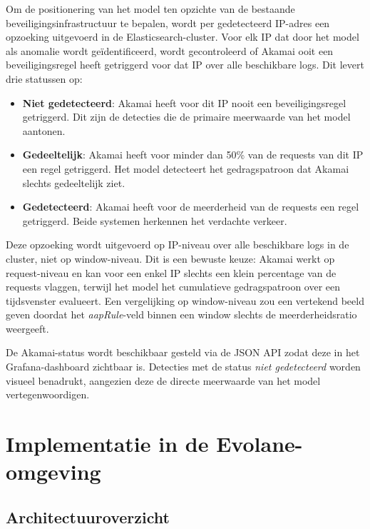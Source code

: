 Om de positionering van het model ten opzichte van de bestaande beveiligingsinfrastructuur te bepalen, wordt per gedetecteerd IP-adres een opzoeking uitgevoerd in de Elasticsearch-cluster. Voor elk IP dat door het model als anomalie wordt geïdentificeerd, wordt gecontroleerd of Akamai ooit een beveiligingsregel heeft getriggerd voor dat IP over alle beschikbare logs. Dit levert drie statussen op:
 
\begin{itemize}
    \item \textbf{Niet gedetecteerd}: Akamai heeft voor dit IP nooit een beveiligingsregel getriggerd. Dit zijn de detecties die de primaire meerwaarde van het model aantonen.
    \item \textbf{Gedeeltelijk}: Akamai heeft voor minder dan 50\% van de requests van dit IP een regel getriggerd. Het model detecteert het gedragspatroon dat Akamai slechts gedeeltelijk ziet.
    \item \textbf{Gedetecteerd}: Akamai heeft voor de meerderheid van de requests een regel getriggerd. Beide systemen herkennen het verdachte verkeer.
\end{itemize}
 
Deze opzoeking wordt uitgevoerd op IP-niveau over alle beschikbare logs in de cluster, niet op window-niveau. Dit is een bewuste keuze: Akamai werkt op request-niveau en kan voor een enkel IP slechts een klein percentage van de requests vlaggen, terwijl het model het cumulatieve gedragspatroon over een tijdsvenster evalueert. Een vergelijking op window-niveau zou een vertekend beeld geven doordat het \textit{aapRule}-veld binnen een window slechts de meerderheidsratio weergeeft.
 
De Akamai-status wordt beschikbaar gesteld via de JSON API zodat deze in het Grafana-dashboard zichtbaar is. Detecties met de status \textit{niet gedetecteerd} worden visueel benadrukt, aangezien deze de directe meerwaarde van het model vertegenwoordigen.
 
\section{Implementatie in de Evolane-omgeving} 
\label{sec:implementatie-evolane}

\subsection{Architectuuroverzicht} 
\label{subsec:architectuuroverzicht}

